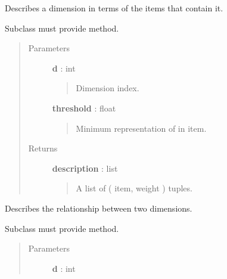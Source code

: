 \documentclass[letterpaper,10pt,english]{sphinxmanual}
\begin{document}
\begin{fulllineitems}

\begin{fulllineitems}
\label{tethne.model.basemodel:tethne.model.basemodel.BaseModel.dimension_items}
Describes a dimension in terms of the items that contain it.

Subclass must provide  method.
\begin{quote}\begin{description}
\item[{Parameters}] \leavevmode
\textbf{d} : int
\begin{quote}

Dimension index.
\end{quote}

\textbf{threshold} : float
\begin{quote}

Minimum representation of  in item.
\end{quote}

\item[{Returns}] \leavevmode
\textbf{description} : list
\begin{quote}

A list of ( item, weight ) tuples.
\end{quote}

\end{description}\end{quote}

\end{fulllineitems}


\begin{fulllineitems}
\label{tethne.model.basemodel:tethne.model.basemodel.BaseModel.dimension_relationship}
Describes the relationship between two dimensions.

Subclass must provide  method.
\begin{quote}\begin{description}
\item[{Parameters}] \leavevmode
\textbf{d} : int
\begin{quote}


\end{quote}
\end{description}
\end{quote}
\end{fulllineitems}
\end{fulllineitems}
\end{document}
